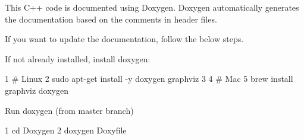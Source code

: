 This C++ code is documented using Doxygen. Doxygen automatically generates the documentation based on the comments in header files.

If you want to update the documentation, follow the below steps.
\begin{DoxyEnumerate}
\item If not already installed, install {\ttfamily doxygen}\+: 
\begin{DoxyCode}
1 # Linux
2 sudo apt-get install -y doxygen graphviz
3 
4 # Mac
5 brew install graphviz doxygen
\end{DoxyCode}

\end{DoxyEnumerate}
\begin{DoxyEnumerate}
\item Run doxygen (from {\ttfamily master} branch) 
\begin{DoxyCode}
1 cd Doxygen
2 doxygen Doxyfile
\end{DoxyCode}
 
\end{DoxyEnumerate}